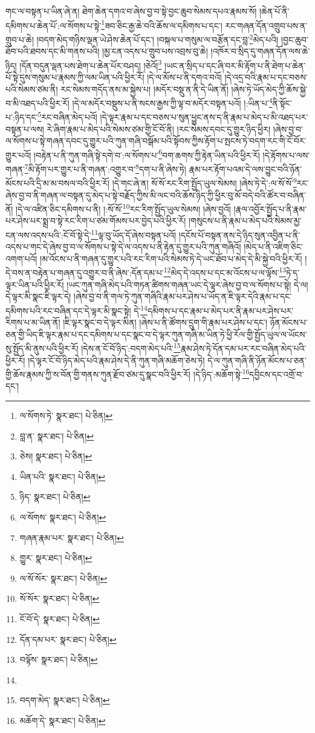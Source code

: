 གང་ལ་བསྟན་པ་ཡིན་ཞེ་ན། ཐེག་ཆེན་དགའ་བ་ཞེས་བྱ་བ་སྟེ་བྱང་ཆུབ་སེམས་དཔའ་རྣམས་སོ། །ཆེན་པོ་ནི་དམིགས་པ་ཆེན་པོ་:ལ་སོགས་པ་སྟེ་\footnote{ལ་སོགས་ཏེ་  སྣར་ཐང་།  པེ་ཅིན། }ཟབ་ཅིང་རྒྱ་ཆེ་བའི་ཆོས་ལ་དམིགས་པ་དང་། རང་གཞན་དོན་འགྲུབ་པས་ན་གྲུབ་པ་ཆེ། །བདག་མེད་གཉིས་ལྡན་ཡེ་ཤེས་ཆེན་པོ་དང་། །བསྐལ་པ་གསུམ་ལ་བརྩོན་དང་བླ་\footnote{བླ་ན་  སྣར་ཐང་།  པེ་ཅིན། }མེད་པའི། །བྱང་ཆུབ་ཐོབ་པའི་ཐབས་དང་མི་གནས་པའི། །མྱ་ངན་འདས་པ་གྲུབ་པས་འབྲས་བུ་ཆེ། །འཁོར་བ་སྲིད་དུ་གཞན་དོན་ལས་ཆེ་ཉིད། །དོན་བདུན་ལྡན་པས་ཐེག་པ་ཆེན་པོར་བཤད། །ཅེའོ།\footnote{ཅེས།  སྣར་ཐང་།  པེ་ཅིན། } །ཡང་ན་སྲིད་པ་དང་ཞི་བར་མི་རྟོག་པ་ནི་ཐེག་པ་ཆེན་པོ་སྟེ་དུས་གསུམ་པ་རྣམས་ཀྱི་ལམ་ཡིན་པའི་ཕྱིར་རོ། །དེ་ལ་མོས་པ་ནི་དགའ་བའོ། །དེ་འདྲ་བའི་རྣམ་པ་དང་བཅས་པའི་སེམས་ཙམ་ནི། རང་སེམས་གདོད་ནས་མ་སྐྱེས་པ། །མདོར་བསྡུ་ན་ནི་དེ་ཡིན་ནོ། །ཞེས་ཏེ་ཡོད་མེད་ཀྱི་ཆོས་སྐྱེ་བ་མི་འཐད་པའི་ཕྱིར་རོ། །དེ་ལ་མདོར་བསྡུས་པ་ནི་སངས་རྒྱས་ཀྱི་ལྟ་བ་མདོར་བསྟན་པའོ། །:ཡིན་པ་\footnote{ཡིན་པའི་  སྣར་ཐང་།  པེ་ཅིན། }ནི་སྟོང་པ་:ཉིད་དང་\footnote{ཉིད་  སྣར་ཐང་།  པེ་ཅིན། }རང་བཞིན་མེད་པའོ། །དེ་ལྟར་རྣམ་པ་དང་བཅས་པ་སུན་ཕྱུང་ནས་ད་ནི་རྣམ་པ་མེད་པ་མི་འཐད་པར་བསྟན་པ་ལས། རེ་ཞིག་རྣམ་པ་མེད་པའི་སེམས་ཙམ་གྱི་ངོ་བོ་ནི། །རང་སེམས་དབང་དུ་གྱུར་ཉིད་ཕྱིར། །ཞེས་བྱ་བ་ལ་སོགས་པ་སྟེ་གཞན་དབང་དུ་གྱུར་པའི་ཀུན་གཞི་བསྒོམ་པའི་སྟོབས་ཀྱིས་རྟོག་པ་སྤངས་ཏེ་བདག་རང་གི་ངོ་བོར་གྱུར་པའོ། །བརྟེན་པ་ནི་ཀུན་གཞི་སྟེ་དགེ་བ་:ལ་སོགས་པ་\footnote{ལ་སོགས་  སྣར་ཐང་།  པེ་ཅིན། }བག་ཆགས་ཀྱི་རྟེན་ཡིན་པའི་ཕྱིར་རོ། །དེ་རྟོགས་པ་ལས་གཞན་\footnote{གཞན་རྣམ་པར་  སྣར་ཐང་།  པེ་ཅིན། }མི་རྟོག་པར་གྱུར་པ་ནི་གཞན་:འགྱུར་བ་\footnote{གྱུར་  སྣར་ཐང་།  པེ་ཅིན། }དག་པ་ནི་ཞེས་ཏེ། རྣམ་པར་རྟོག་པའམ་དེ་ལས་བྱུང་བའི་ཉོན་མོངས་པའི་དྲི་མ་མ་བསལ་བའི་ཕྱིར་རོ། །དེ་གང་ཞེ་ན། སོ་སོ་རང་རིག་སྤྱོད་ཡུལ་སེམས། །ཞེས་ཏེ་དེ་:ལ་སོ་སོ་\footnote{ལ་སོ་སོར་  སྣར་ཐང་།  པེ་ཅིན། }རང་ཞེས་བྱ་བ་ནི་གཞན་ལ་བསྟན་དུ་མེད་པ་སྟེ་བརྗོད་ཀྱིས་མི་ལང་བའི་ཆོས་ཉིད་ཀྱི་ཕྱིར་བུ་མོ་བདེ་བའི་ཚོར་བ་བཞིན་ནོ། །དེ་ལ་འཛིན་ཅིང་དམིགས་པ་ནི། །:སོ་སོ་\footnote{སོ་སོར་  སྣར་ཐང་།  པེ་ཅིན། }རང་རིག་སྤྱོད་ཡུལ་སེམས། །ཞེས་བྱའོ། །རྣལ་འབྱོར་སྤྱོད་པ་ནི་རྣམ་པར་ཤེས་པར་སྨྲ་བ་སྟེ་རང་རིག་པ་ཙམ་གོམས་པར་བྱེད་པའི་ཕྱིར་རོ། །གསུངས་པ་ནི་རྣམ་པ་མེད་པའི་སེམས་མྱ་ངན་ལས་འདས་པའི་:ངོ་བོ་སྟེ་དེ་\footnote{ངོ་བོ་དེ་  སྣར་ཐང་།  པེ་ཅིན། }ལྟ་བུ་ཡོད་དོ་ཞེས་བསྟན་པའོ། །དངོས་པོ་བསྟན་ནས་དེ་ཉིད་སུན་འབྱིན་པ་ནི་འདས་པ་གང་དེ་ཞེས་བྱ་བ་ལ་སོགས་པ་སྟེ་དེ་ལ་འདས་པ་ནི་རྟེན་དུ་གྱུར་པའི་ཀུན་གཞིའོ། །མེད་པ་ནི་འཇིག་ཅིང་འགག་པའོ། །མ་འོངས་པ་ནི་གཞན་དུ་གྱུར་པའི་རང་རིག་པའི་སེམས་ཏེ་དེ་ཡང་ཐོབ་པ་མེད་དེ་མི་སྐྱེ་བའི་ཕྱིར་རོ། །དེ་བས་ན་བརྟེན་པ་གཞན་དུ་འགྱུར་བ་ནི་ཞེས་:དོན་དམ་པ་\footnote{དོན་དམ་པར་  སྣར་ཐང་།  པེ་ཅིན། }མེད་དེ་འདས་པ་དང་མ་འོངས་པ་ལ་ལྟོས་\footnote{བལྟོས་  སྣར་ཐང་།  པེ་ཅིན། }ཏེ་ད་ལྟར་ཡིན་པའི་ཕྱིར་རོ། །ཡང་ཀུན་གཞི་མེད་པའི་གཏན་ཚིགས་གཞན་ཡང་དེ་ལྟར་ཞེས་བྱ་བ་ལ་སོགས་པ་སྟེ། དེ་ལ། དེ་ལྟར་མི་སྣང་ཇི་ལྟར་དེ། །ཞེས་བྱ་བ་ནི་གལ་ཏེ་ཀུན་གཞིའི་རྣམ་པར་ཤེས་པ་ཡོད་ན་ཇི་ལྟར་དེའི་རྣམ་པ་དང་དམིགས་པའི་རང་བཞིན་དང་དེ་ལྟར་མི་སྣང་སྟེ། དེ་\footnote{}དམིགས་པ་དང་རྣམ་པ་མེད་པར་ནི་རྣམ་པར་ཤེས་པར་རིགས་པ་མ་ཡིན་ནོ། །ཇི་ལྟར་སྣང་བ་དེ་ལྟར་མིན། །ཞེས་པ་ནི་ཚོགས་དྲུག་གི་རྣམ་པར་ཤེས་པ་དང་། ཉོན་མོངས་པ་ཅན་གྱི་ཡིད་ཇི་ལྟར་རྣམ་པ་དང་དམིགས་པ་དང་སྣང་བ་དེ་ལྟར་ཀུན་གཞི་མ་ཡིན་ཏེ་ཕྱི་རོལ་གྱི་སྤྱོད་ཡུལ་ལ་ཡོངས་སུ་སྤྱོད་མི་ནུས་པའི་ཕྱིར་རོ། །དེས་ན་ངོ་བོ་ཉིད་:བདག་མེད་པའི་\footnote{བདག་མེད་  སྣར་ཐང་།  པེ་ཅིན། }རྣམ་ཤེས་ཏེ་དོན་དམ་པར་རང་བཞིན་མེད་པའི་ཕྱིར་རོ། །དེ་ལྟར་ངོ་བོ་ཉིད་མེད་པའི་རྣམ་ཤེས་དེ་ནི་ཀུན་གཞི་མཆོག་ཅེས་ཏེ། དེ་ལ་ཀུན་གཞི་ནི་ཉོན་མོངས་པ་ཅན་གྱི་ཆོས་རྣམས་ཀྱི་ས་བོན་གྱི་གནས་ཀུན་རྫོབ་ཙམ་དུ་སྣང་བའི་ཕྱིར་རོ། །དེ་ཉིད་:མཆོག་སྟེ་\footnote{མཆོག་དེ་  སྣར་ཐང་།  པེ་ཅིན། }དབྱིངས་དང་འགྲོ་བ་དང་། 